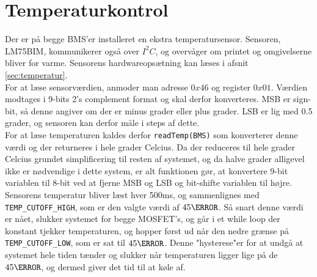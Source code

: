 \section{Temperaturkontrol}\label{sec:temp_protect}
Der er på begge BMS'er installeret en ekstra temperatursensor. Sensoren, LM75BIM, kommunikerer også over $I^2C$, og overvåger om printet og omgivelserne bliver for varme. Sensorens hardwareopsætning kan læses i afsnit \ref{sec:temperatur}. \\

For at læse sensorværdien, anmoder man adresse $0x46$ og register $0x01$. Værdien modtages i 9-bits 2's complement format og skal derfor konverteres. MSB er sign-bit, så denne angiver om der er minus grader eller plus grader. LSB er lig med 0.5 grader, og sensoren kan derfor måle i steps af dette. \\

For at læse temperaturen kaldes derfor \verb|readTemp(BMS)| som konverterer denne værdi og der returneres i hele grader Celcius. Da der reduceres til hele grader Celcius grundet simplificering til resten af systemet, og da halve grader alligevel ikke er nødvendige i dette system, er alt funktionen gør, at konvertere 9-bit variablen til 8-bit ved at fjerne MSB og LSB og bit-shifte variablen til højre. \\

Sensorens temperatur bliver læst hver 500ms, og sammenlignes med \verb|TEMP_CUTOFF_HIGH|, som er den valgte værdi af $45\degreeCelsius$. Så snart denne værdi er nået, slukker systemet for begge MOSFET's, og går i et while loop der konstant tjekker temperaturen, og hopper først ud når den nedre grænse på \verb|TEMP_CUTOFF_LOW|, som er sat til $45\degreeCelsius$. Denne "hysterese"\space er for at undgå at systemet hele tiden tænder og slukker når temperaturen ligger lige på de $45\degreeCelsius$, og dermed giver det tid til at køle af. 